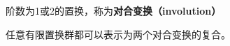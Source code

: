 
\begin{definition}{}
阶数为1或2的置换，称为\textbf{对合变换（involution）}
\end{definition}
\begin{theorem}{}
任意有限置换群都可以表示为两个对合变换的复合。
\end{theorem}
